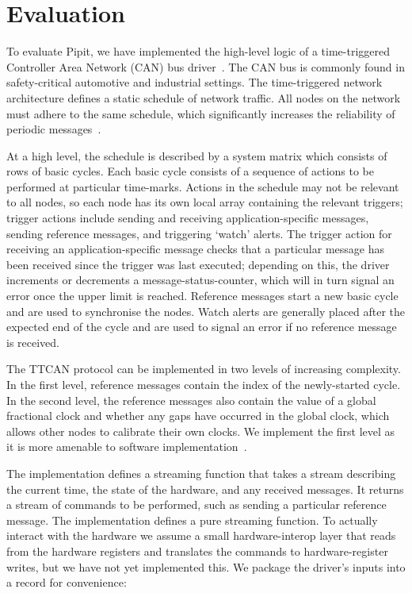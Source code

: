 
\section{Evaluation}
\label{s:evaluation}

To evaluate Pipit, we have implemented the high-level logic of a time-triggered Controller Area Network (CAN) bus driver~\cite{ISO11898_4}.
The CAN bus is commonly found in safety-critical automotive and industrial settings.
The time-triggered network architecture defines a static schedule of network traffic.
All nodes on the network must adhere to the same schedule, which significantly increases the reliability of periodic messages~\cite{fuehrer2001time}.

At a high level, the schedule is described by a system matrix which consists of rows of basic cycles.
Each basic cycle consists of a sequence of actions to be performed at particular time-marks.
Actions in the schedule may not be relevant to all nodes, so each node has its own local array containing the relevant triggers; trigger actions include sending and receiving application-specific messages, sending reference messages, and triggering `watch' alerts.
The trigger action for receiving an application-specific message checks that a particular message has been received since the trigger was last executed; depending on this, the driver increments or decrements a message-status-counter, which will in turn signal an error once the upper limit is reached.
Reference messages start a new basic cycle and are used to synchronise the nodes.
Watch alerts are generally placed after the expected end of the cycle and are used to signal an error if no reference message is received.

The TTCAN protocol can be implemented in two levels of increasing complexity.
In the first level, reference messages contain the index of the newly-started cycle.
In the second level, the reference messages also contain the value of a global fractional clock and whether any gaps have occurred in the global clock, which allows other nodes to calibrate their own clocks.
We implement the first level as it is more amenable to software implementation~\cite{hartwich2002integration}.

The implementation defines a streaming function that takes a stream describing the current time, the state of the hardware, and any received messages.
It returns a stream of commands to be performed, such as sending a particular reference message.
The implementation defines a pure streaming function.
To actually interact with the hardware we assume a small hardware-interop layer that reads from the hardware registers and translates the commands to hardware-register writes, but we have not yet implemented this.
We package the driver's inputs into a record for convenience:

